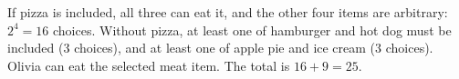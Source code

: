 If pizza is included, all three can eat it, and the other four items are arbitrary: $2^4=16$ choices. Without pizza, at least one of hamburger and hot dog must be included ($3$ choices), and at least one of apple pie and ice cream ($3$ choices). Olivia can eat the selected meat item. The total is $16+9=\boxed{25}$.
